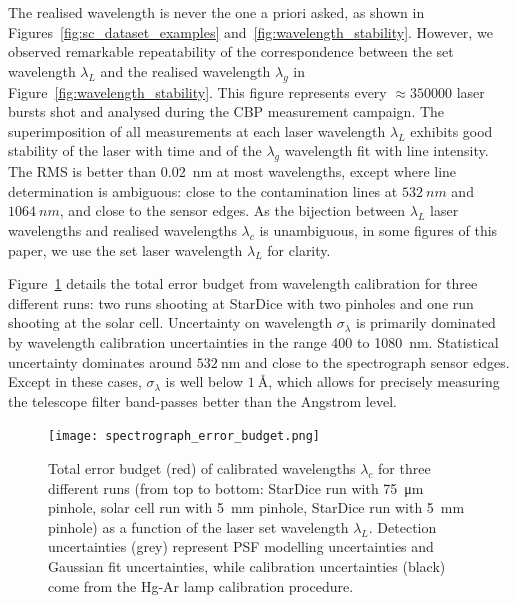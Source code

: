 The realised wavelength is never the one a priori asked, as shown in Figures~\ref{fig:sc_dataset_examples} and~\ref{fig:wavelength_stability}. However, we observed remarkable repeatability of the correspondence between the set wavelength $\lambda_L$ and the realised wavelength $\lambda_g$ in Figure~\ref{fig:wavelength_stability}. This figure represents every $\approx\num{350000}$ laser bursts shot and analysed during the CBP measurement campaign. The superimposition of all measurements at each laser wavelength $\lambda_L$ exhibits good stability of the laser with time and of the $\lambda_g$ wavelength fit with line intensity. The RMS is better than \SI{0.02}{\nm} at most wavelengths, except where line determination is ambiguous: close to the contamination lines at $\SI{532}{nm}$ and $\SI{1064}{nm}$, and close to the sensor edges. As the bijection between $\lambda_L$ laser wavelengths and realised wavelengths $\lambda_c$ is unambiguous, in some figures of this paper, we use the set laser wavelength $\lambda_L$ for clarity. 

Figure~\ref{fig:wavelength_error_budget} details the total error budget from wavelength calibration for three different runs: two runs shooting at StarDice with two pinholes and one run shooting at the solar cell. Uncertainty on wavelength $\sigma_\lambda$ is primarily dominated by wavelength calibration uncertainties in the range 400 to \SI{1080}{\nm}. Statistical uncertainty dominates around $\SI{532}{\nm}$ and close to the spectrograph sensor edges. Except in these cases, $\sigma_\lambda$ is well below $\SI{1}{\angstrom}$, which allows for precisely measuring the telescope filter band-passes better than the Angstrom level.   


\begin{figure}[!h]
\centering
\texttt{[image: spectrograph\_error\_budget.png]}
\caption{Total error budget (red) of calibrated wavelengths $\lambda_c$ for three different runs (from top to bottom: StarDice run with \SI{75}{\um} pinhole, solar cell run with \SI{5}{mm} pinhole, StarDice run with \SI{5}{mm} pinhole) as a function of the laser set wavelength $\lambda_L$. Detection uncertainties (grey) represent PSF modelling uncertainties and Gaussian fit uncertainties, while calibration uncertainties (black) come from the Hg-Ar lamp calibration procedure. }\label{fig:wavelength_error_budget}
\end{figure}


